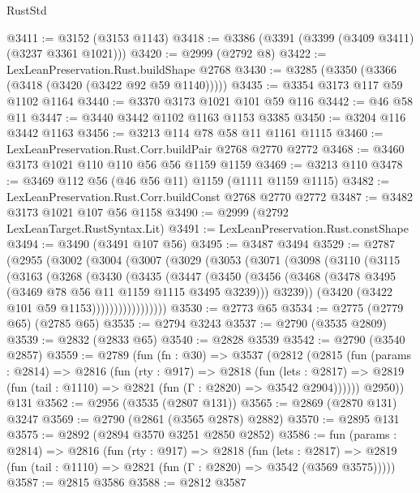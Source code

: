 \begin{lexlean}{RustStd}
\begin{coremodule}
@3411 := @3152 (@3153 @1143)
@3418 := @3386 (@3391 (@3399 (@3409 @3411) (@3237 @3361 @1021)))
@3420 := @2999 (@2792 @8)
@3422 := LexLeanPreservation.Rust.buildShape @2768
@3430 := @3285 (@3350 (@3366 (@3418 (@3420 (@3422 @92 @59 @1140)))))
@3435 := @3354 @3173 @117 @59 @1102 @1164
@3440 := @3370 @3173 @1021 @101 @59 @116
@3442 := @46 @58 @11
@3447 := @3440 @3442 @1102 @1163 @1153 @3385
@3450 := @3204 @116 @3442 @1163
@3456 := @3213 @114 @78 @58 @11 @1161 @1115
@3460 := LexLeanPreservation.Rust.Corr.buildPair @2768 @2770 @2772
@3468 := @3460 @3173 @1021 @110 @110 @56 @56 @1159 @1159
@3469 := @3213 @110
@3478 := @3469 @112 @56 (@46 @56 @11) @1159 (@1111 @1159 @1115)
@3482 := LexLeanPreservation.Rust.Corr.buildConst @2768 @2770 @2772
@3487 := @3482 @3173 @1021 @107 @56 @1158
@3490 := @2999 (@2792 LexLeanTarget.RustSyntax.Lit)
@3491 := LexLeanPreservation.Rust.constShape
@3494 := @3490 (@3491 @107 @56)
@3495 := @3487 @3494
@3529 := @2787
    (@2955
      (@3002
        (@3004
          (@3007
            (@3029
              (@3053
                (@3071
                  (@3098
                    (@3110
                      (@3115
                        (@3163
                          (@3268
                            (@3430
                              (@3435
                                (@3447
                                  (@3450
                                    (@3456
                                      (@3468
                                        (@3478 @3495 (@3469 @78 @56 @11 @1159 @1115 @3495 @3239)))
                                      @3239))
                                  (@3420 (@3422 @101 @59 @1153)))))))))))))))))
@3530 := @2773 @65
@3534 := @2775 (@2779 @65) (@2785 @65)
@3535 := @2794 @3243
@3537 := @2790 (@3535 @2809)
@3539 := @2832 (@2833 @65)
@3540 := @2828 @3539
@3542 := @2790 (@3540 @2857)
@3559 := @2789
    (fun (fn : @30) =>
    @3537
      (@2812
        (@2815
          (fun (params : @2814) =>
          @2816
            (fun (rty : @917) =>
            @2818
              (fun (lets : @2817) =>
              @2819 (fun (tail : @1110) => @2821 (fun (Γ : @2820) => @3542 @2904))))))
        @2950))
    @131
@3562 := @2956 (@3535 (@2807 @131))
@3565 := @2869 (@2870 @131) @3247
@3569 := @2790 (@2861 (@3565 @2878) @2882)
@3570 := @2895 @131
@3575 := @2892 (@2894 @3570 @3251 @2850 @2852)
@3586 := fun (params : @2814) =>
  @2816
    (fun (rty : @917) =>
    @2818
      (fun (lets : @2817) =>
      @2819 (fun (tail : @1110) => @2821 (fun (Γ : @2820) => @3542 (@3569 @3575)))))
@3587 := @2815 @3586
@3588 := @2812 @3587

\end{coremodule}
\end{lexlean}
